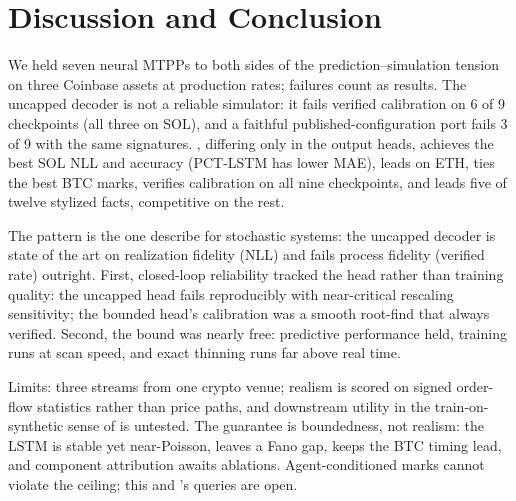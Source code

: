 \section{Discussion and Conclusion}
\label{sec:conclusion}

We held seven neural MTPPs to both sides of the prediction--simulation
tension on three Coinbase assets at production rates; failures count as
results. The uncapped \sppp{}
decoder is not a reliable simulator: it fails verified calibration on 6
of 9 checkpoints (all three on SOL), and a faithful published-configuration
port fails 3 of 9 with the same signatures. \ssppp{}, differing only in the output heads, achieves the best SOL NLL
and accuracy (PCT-LSTM has lower MAE), leads on ETH, ties the best BTC
marks, verifies calibration on all nine checkpoints, and leads five of
twelve stylized facts, competitive on the rest.

The pattern is the one \citet{kumar2025f2sp} describe for stochastic
systems: the uncapped decoder is state of the art on realization fidelity
(NLL) and fails process fidelity (verified rate) outright. First,
closed-loop reliability tracked the head rather than training quality:
the uncapped head fails reproducibly with near-critical rescaling
sensitivity; the bounded head's calibration was a smooth root-find that
always verified.
Second, the bound was nearly free: predictive performance held, training
runs at scan speed, and exact thinning runs far above real time.

Limits: three streams from one crypto venue; realism is scored on signed
order-flow statistics rather than price paths, and downstream utility in
the train-on-synthetic sense of \citet{ang2026ctbench} is untested.
The guarantee is boundedness, not realism: the LSTM is stable yet
near-Poisson, \ssppp{} leaves a Fano gap, \nhp{} keeps the BTC timing
lead, and component attribution awaits ablations. Agent-conditioned marks
cannot violate the ceiling; this and \citet{chang2024probabilistic}'s
queries are open.
